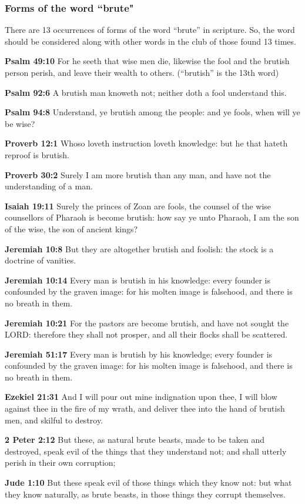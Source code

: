 \subsubsection{Forms of the word ``brute"}
There are 13 occurrences of forms of the word ``brute'' in scripture. So, the word should be considered along with other words in the club of those found 13 times.

\begin{compactenum}
    \item \textbf{Psalm 49:10} For he seeth that wise men die, likewise the fool and the brutish person perish, and leave their wealth to others. (``brutish'' is the 13th word)
    \item \textbf{Psalm 92:6}  A brutish man knoweth not; neither doth a fool understand this.
    \item \textbf{Psalm 94:8} Understand, ye brutish among the people: and ye fools, when will ye be wise?
    \item \textbf{Proverb 12:1}  Whoso loveth instruction loveth knowledge: but he that hateth reproof is brutish.
    \item \textbf{Proverb 30:2} Surely I am more brutish than any man, and have not the understanding of a man.
    \item \textbf{Isaiah 19:11} Surely the princes of Zoan are fools, the counsel of the wise counsellors of Pharaoh is become brutish: how say ye unto Pharaoh, I am the son of the wise, the son of ancient kings?
    \item \textbf{Jeremiah 10:8} But they are altogether brutish and foolish: the stock is a doctrine of vanities.
    \item \textbf{Jeremiah 10:14} Every man is brutish in his knowledge: every founder is confounded by the graven image: for his molten image is falsehood, and there is no breath in them.
    \item \textbf{Jeremiah 10:21}  For the pastors are become brutish, and have not sought the LORD: therefore they shall not prosper, and all their flocks shall be scattered.
    \item \textbf{Jeremiah 51:17} Every man is brutish by his knowledge; every founder is confounded by the graven image: for his molten image is falsehood, and there is no breath in them.
    \item \textbf{Ezekiel 21:31} And I will pour out mine indignation upon thee, I will blow against thee in the fire of my wrath, and deliver thee into the hand of brutish men, and skilful to destroy.
    \item \textbf{2 Peter 2:12} But these, as natural brute beasts, made to be taken and destroyed, speak evil of the things that they understand not; and shall utterly perish in their own corruption;
    \item \textbf{Jude 1:10} But these speak evil of those things which they know not: but what they know naturally, as brute beasts, in those things they corrupt themselves.
\end{compactenum}